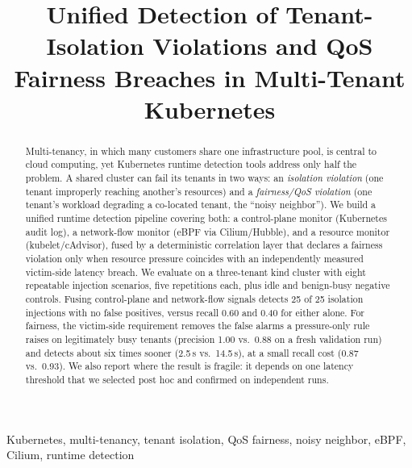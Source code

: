 \documentclass[conference]{IEEEtran}
\begin{document}
\title{Unified Detection of Tenant-Isolation Violations and QoS Fairness Breaches in Multi-Tenant Kubernetes}

\author{
\and
{}
}

\maketitle

\begin{abstract}
Multi-tenancy, in which many customers share one infrastructure pool, is central to cloud computing, yet Kubernetes runtime detection tools address only half the problem. A shared cluster can fail its tenants in two ways: an \emph{isolation violation} (one tenant improperly reaching another's resources) and a \emph{fairness/QoS violation} (one tenant's workload degrading a co-located tenant, the ``noisy neighbor''). We build a unified runtime detection pipeline covering both: a control-plane monitor (Kubernetes audit log), a network-flow monitor (eBPF via Cilium/Hubble), and a resource monitor (kubelet/cAdvisor), fused by a deterministic correlation layer that declares a fairness violation only when resource pressure coincides with an independently measured victim-side latency breach. We evaluate on a three-tenant kind cluster with eight repeatable injection scenarios, five repetitions each, plus idle and benign-busy negative controls. Fusing control-plane and network-flow signals detects 25 of 25 isolation injections with no false positives, versus recall 0.60 and 0.40 for either alone. For fairness, the victim-side requirement removes the false alarms a pressure-only rule raises on legitimately busy tenants (precision 1.00 vs.\ 0.88 on a fresh validation run) and detects about six times sooner (2.5\,s vs.\ 14.5\,s), at a small recall cost (0.87 vs.\ 0.93). We also report where the result is fragile: it depends on one latency threshold that we selected post hoc and confirmed on independent runs.
\end{abstract}

\begin{IEEEkeywords}
Kubernetes, multi-tenancy, tenant isolation, QoS fairness, noisy neighbor, eBPF, Cilium, runtime detection
\end{IEEEkeywords}
\end{document}
